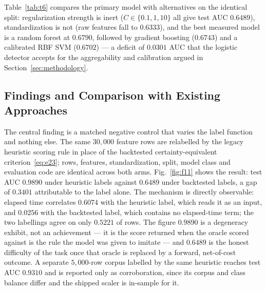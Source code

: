 Table~\ref{tab:t6} compares the primary model with alternatives on the
identical split: regularization strength is inert ($C\in\{0.1,1,10\}$ all give
test AUC $0.6489$), standardization is not (raw features fall to $0.6333$),
and the best measured model is a random forest at $0.6790$, followed by
gradient boosting ($0.6743$) and a calibrated RBF SVM ($0.6702$) --- a
deficit of $0.0301$ AUC that the logistic detector accepts for the
aggregability and calibration argued in Section~\ref{sec:methodology}.

\subsection{Findings and Comparison with Existing Approaches}

The central finding is a matched negative control that varies the label
function and nothing else. The same $30{,}000$ feature rows are relabelled by
the legacy heuristic scoring rule in place of the backtested
certainty-equivalent criterion~\eqref{eq:e23}; rows, features, standardization,
split, model class and evaluation code are identical across both arms.
Fig.~\ref{fig:f11} shows the result: test AUC $0.9890$ under heuristic labels
against $0.6489$ under backtested labels, a gap of $0.3401$ attributable to
the label alone. The mechanism is directly observable: elapsed time correlates
$0.6074$ with the heuristic label, which reads it as an input, and $0.0256$
with the backtested label, which contains no elapsed-time term; the two
labellings agree on only $0.5221$ of rows. The figure $0.9890$ is a degeneracy
exhibit, not an achievement --- it is the score returned when the oracle
scored against is the rule the model was given to imitate --- and $0.6489$ is
the honest difficulty of the task once that oracle is replaced by a forward,
net-of-cost outcome. A separate $5{,}000$-row corpus labelled by the same
heuristic reaches test AUC $0.9310$ and is reported only as corroboration,
since its corpus and class balance differ and the shipped scaler is in-sample
for it.

